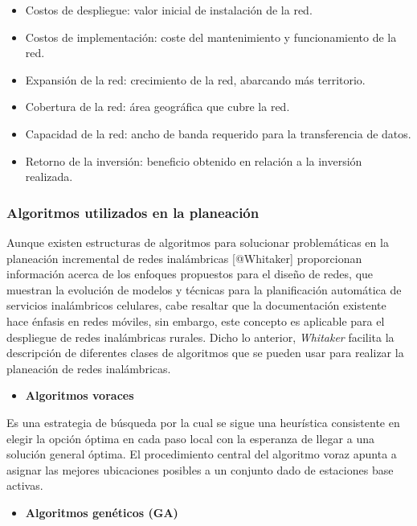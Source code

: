 \documentclass[]{article}
\providecommand{\tightlist}{%
  \setlength{\itemsep}{0pt}\setlength{\parskip}{0pt}}
\begin{document}
\begin{itemize}
\item
  Costos de despliegue: valor inicial de instalación de la red.
\item
  Costos de implementación: coste del mantenimiento y funcionamiento de
  la red.
\item
  Expansión de la red: crecimiento de la red, abarcando más territorio.
\item
  Cobertura de la red: área geográfica que cubre la red.
\item
  Capacidad de la red: ancho de banda requerido para la transferencia de
  datos.
\item
  Retorno de la inversión: beneficio obtenido en relación a la inversión
  realizada.
\end{itemize}

\subsubsection{Algoritmos utilizados en la
planeación}\label{algoritmos-utilizados-en-la-planeaciuxf3n}

Aunque existen estructuras de algoritmos para solucionar problemáticas
en la planeación incremental de redes inalámbricas {[}@Whitaker{]}
proporcionan información acerca de los enfoques propuestos para el
diseño de redes, que muestran la evolución de modelos y técnicas para la
planificación automática de servicios inalámbricos celulares, cabe
resaltar que la documentación existente hace énfasis en redes móviles,
sin embargo, este concepto es aplicable para el despliegue de redes
inalámbricas rurales. Dicho lo anterior, \emph{Whitaker} facilita la
descripción de diferentes clases de algoritmos que se pueden usar para
realizar la planeación de redes inalámbricas.

\begin{itemize}
\tightlist
\item
  \textbf{Algoritmos voraces}
\end{itemize}

Es una estrategia de búsqueda por la cual se sigue una heurística
consistente en elegir la opción óptima en cada paso local con la
esperanza de llegar a una solución general óptima. El procedimiento
central del algoritmo voraz apunta a asignar las mejores ubicaciones
posibles a un conjunto dado de estaciones base activas.

\begin{itemize}
\tightlist
\item
  \textbf{Algoritmos genéticos (GA)}
\end{itemize}
\end{document}
